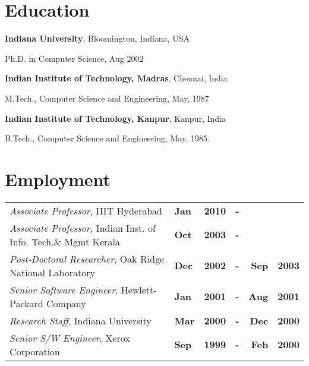 \documentclass[11pt,margin,line]{res}
\newenvironment{list1}{
  \begin{list}{\ding{113}}{%
      \setlength{\itemsep}{0in}
      \setlength{\parsep}{0in} \setlength{\parskip}{0in}
      \setlength{\topsep}{0in} \setlength{\partopsep}{0in} 
      \setlength{\leftmargin}{0.17in}}}{\end{list}}
\begin{document}
\begin{resume}
\section{\sc Education}
{\bf Indiana University}, Bloomington, Indiana, USA\\
\vspace*{-.1in}
\begin{list1}
\item[] Ph.D. in Computer Science, Aug 2002
\end{list1}

{\bf Indian Institute of Technology, Madras}, Chennai, India\\
\vspace*{-.1in}
\begin{list1}
\item[] M.Tech., Computer Science and Engineering,  May, 1987
\end{list1}

{\bf Indian Institute of Technology, Kanpur}, Kanpur, India\\
\vspace*{-.1in}
\begin{list1}
\item[] B.Tech., Computer Science and Engineering,  May, 1985. %
\end{list1}

\section{\sc Employment}


\newcommand\T{\rule{0pt}{2.8ex}}


\begin{tabular}{lllcrr}
{\em Associate Professor}, IIIT Hyderabad & {\bf
  Jan} & {\bf 2010\/} & {\bf -} &  & \T\\
{\em Associate Professor,} Indian Inst. of Info. Tech.\&
  Mgmt Kerala  & {\bf Oct\/} & {\bf 2003\/} & {\bf -} &\T\\
{\em Post-Doctoral Researcher}, Oak Ridge National
  Laboratory & {\bf Dec\/} & {\bf 2002\/} & {\bf -\/}  & {\bf Sep\/} &
  {\bf 2003\/}\T\\ %
{\em  Senior Software Engineer}, Hewlett-Packard Company & 
{\bf Jan\/} &  {\bf 2001\/} & {\bf -\/}  & {\bf Aug\/} & {\bf
  2001\/}\T\\ %
 {\em Research Staff}, Indiana University &
{\bf Mar\/} & {\bf 2000\/} & {\bf -}  & {\bf Dec\/} & {\bf
  2000\/}\T\\%
{\em Senior S/W Engineer}, Xerox Corporation & {\bf
  Sep} & {\bf 1999\/} &  {\bf -}  & {\bf Feb\/} & {\bf 2000\/}\T\\%
\end{tabular}


\end{resume}
\end{document}
